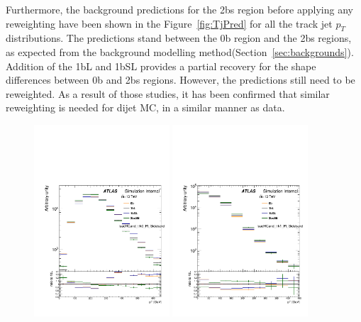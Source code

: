 Furthermore, the background predictions for the 2bs region before applying any reweighting have been shown in the Figure~\ref{fig:TjPred} for all the track jet $p_{T}$ distributions. The predictions stand between the 0b region and the 2bs regions, as expected from the background modelling method(Section~\ref{sec:backgrounds}). Addition of the 1bL and 1bSL provides a partial recovery for the shape differences between 0b and 2bs regions. However, the predictions still need to be reweighted. As a result of those studies, it has been confirmed that similar reweighting is needed for dijet MC, in a similar manner as data. 

\begin{figure}[htbp!]
\begin{center}
\includegraphics[width=0.45\textwidth,angle=-90]{figures/boosted/AppendixDijetMC/leadHCand_trk0_Pt_SidebandwoPr_data.pdf}
\includegraphics[width=0.45\textwidth,angle=-90]{figures/boosted/AppendixDijetMC/leadHCand_trk1_Pt_SidebandwoPr_data.pdf}

\end{center}
\end{figure}
